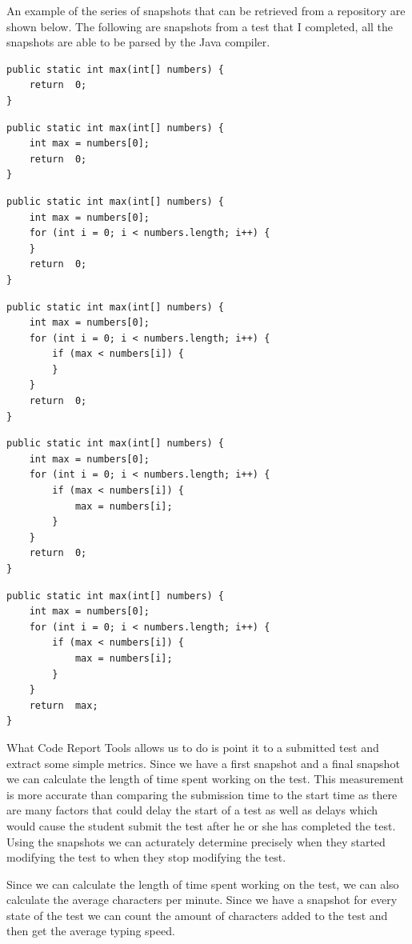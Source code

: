 \documentclass[twocolumn]{article}
\begin{document}
An example of the series of snapshots that can be retrieved from a repository
are shown below. The following are snapshots from a test that I completed, all
the snapshots are able to be parsed by the Java compiler.
\begin{lstlisting}[frame=single]
public static int max(int[] numbers) {
	return 	0;
}
\end{lstlisting}
\begin{lstlisting}[frame=single]
public static int max(int[] numbers) {
	int max = numbers[0];
	return 	0;
}
\end{lstlisting}
\begin{lstlisting}[frame=single]
public static int max(int[] numbers) {
	int max = numbers[0];
	for (int i = 0; i < numbers.length; i++) {
	}
	return 	0;
}
\end{lstlisting}
\begin{lstlisting}[frame=single]
public static int max(int[] numbers) {
	int max = numbers[0];
	for (int i = 0; i < numbers.length; i++) {
		if (max < numbers[i]) {
		}
	}
	return 	0;
}
\end{lstlisting}
\begin{lstlisting}[frame=single]
public static int max(int[] numbers) {
	int max = numbers[0];
	for (int i = 0; i < numbers.length; i++) {
		if (max < numbers[i]) {
			max = numbers[i];
		}
	}
	return 	0;
}
\end{lstlisting}
\begin{lstlisting}[frame=single]
public static int max(int[] numbers) {
	int max = numbers[0];
	for (int i = 0; i < numbers.length; i++) {
		if (max < numbers[i]) {
			max = numbers[i];
		}
	}
	return 	max;
}
\end{lstlisting}

What Code Report Tools allows us to do is point it to a submitted test and
extract some simple metrics. Since we have a first snapshot and a final
snapshot we can calculate the length of time spent working on the test. This
measurement is more accurate than comparing the submission time to the start
time as there are many factors that could delay the start of a test as well as
delays which would cause the student submit the test after he or she has
completed the test. Using the snapshots we can acturately determine precisely
when they started modifying the test to when they stop modifying the test.

Since we can calculate the length of time spent working on the test, we can
also calculate the average characters per minute. Since we have a snapshot for
every state of the test we can count the amount of characters added to the test
and then get the average typing speed.
\end{document}
